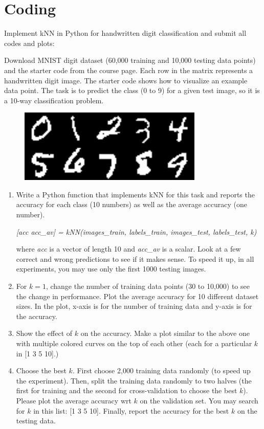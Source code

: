 \documentclass[fleqn]{article}
\begin{document}
\section{Coding}

Implement kNN in Python for handwritten digit classification and submit all codes and plots:

Download MNIST digit dataset (60,000 training and 10,000 testing data points) and the starter code from the course page. Each row in the matrix represents a handwritten digit image. The starter code shows how to visualize an example data point. The task is to predict the class (0 to 9) for a given test image, so it is a 10-way classification problem.

\begin{figure}[h]
	\centering
	\includegraphics[width=.4\linewidth]{mnist-dataset.png}
\end{figure}


\begin{enumerate}


	\item Write a Python function that implements kNN for this task and reports the accuracy for each class (10 numbers) as well as the average accuracy (one number).

		      {\em [acc acc\_av] = kNN(images\_train, labels\_train, images\_test, labels\_test, k)}

	      where {\em acc} is a vector of length 10 and {\em acc\_av} is a scalar. Look at a few correct and wrong predictions to see if it makes sense. To speed it up, in all experiments, you may use only the first 1000 testing images.

	\item For $k=1$, change the number of training data points (30 to 10,000) to see the change in performance. Plot the average accuracy for 10 different dataset sizes. In the plot, x-axis is for the number of training data and y-axis is for the accuracy.

	\item Show the effect of $k$ on the accuracy. Make a plot similar to the above one with multiple colored curves on the top of each other (each for a particular $k$ in [1 3 5 10].)

	\item Choose the best $k$. First choose 2,000 training data randomly (to speed up the experiment). Then, split the training data randomly to two halves (the first for training and the second for cross-validation to choose the best $k$). Please plot the average accuracy wrt $k$ on the validation set. You may search for $k$ in this list: [1 3 5 10]. Finally, report the accuracy for the best $k$ on the testing data.

\end{enumerate}
\end{document}
